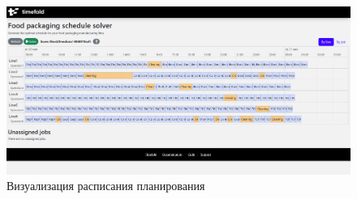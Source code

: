  \begin{figure}[ht]
 \centering
		\includegraphics[height = 8 cm, keepaspectratio]{../assets/images/3_1_1Quarkus.png}
		\caption{Визуализация расписания планирования}
		\label{fig:quarkus_3_1}
\end{figure}


